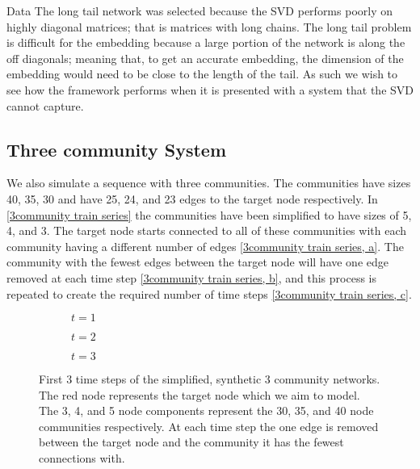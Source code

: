 \documentclass[12pt]{amsart}
\begin{document}
\begin{section}{Data}
        The long tail network was selected because the SVD performs poorly on highly diagonal matrices; that is matrices with long chains.  The long tail problem is difficult for the embedding because a large portion of the network is along the off diagonals; meaning that, to get an accurate embedding, the dimension of the embedding would need to be close to the length of the tail. As such we wish to see how the framework performs when it is presented with a system that the SVD cannot capture.

    \subsection{Three community System}
    We also simulate a sequence with three communities. The communities have sizes 40, 35, 30 and have 25, 24, and 23 edges to the target node respectively. In \autoref{3community train series} the communities have been simplified to have sizes of 5, 4, and 3. The target node starts connected to all of these communities with each community having a different number of edges \autoref{3community train series, a}. The community with the fewest edges between the target node will have one edge removed at each time step \autoref{3community train series, b}, and this process is repeated to create the required number of time steps \autoref{3community train series, c}.  
    \begin{figure}[H]
        \centering
        \centering
        \begin{subfigure}[c]{0.3\textwidth}
            \centering
            \resizebox{.6\width}{!}{}
            \caption{$t=1$}
            \label{3community train series, a}
        \end{subfigure}
        \hfill
        \centering
        \begin{subfigure}[c]{0.3\textwidth}
            \centering
            \resizebox{.6\width}{!}{}
            \caption{$t=2$}
            \label{3community train series, b}            
        \end{subfigure}
        \hfill
        \centering
        \begin{subfigure}[c]{0.3\textwidth}
            \centering
            \resizebox{.6\width}{!}{}
            \caption{$t=3$}
            \label{3community train series, c}
        \end{subfigure}
        \caption{First 3 time steps of the simplified, synthetic 3 community networks. The red node represents the target node which we aim to model. The 3, 4, and 5 node components represent the 30, 35, and 40 node communities respectively. At each time step the one edge is removed between the target node and the community it has the fewest connections with.}
        \label{3community train series}
    \end{figure}
     

\end{section}
\end{document}
